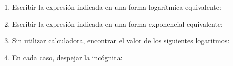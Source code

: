 \documentclass[11pt]{article}
\begin{document}
\begin{enumerate}
\item Escribir la expresi\'on indicada en una forma logar\'itmica equivalente:
  \begin{enumerate}
    
  \end{enumerate}

  
\item Escribir la expresi\'on indicada en una forma exponencial equivalente:



\item Sin utilizar calculadora, encontrar el valor de los siguientes logaritmos:
  \begin{enumerate}
  \end{enumerate}

  
\item En cada caso, despejar la inc\'ognita:
  \begin{enumerate}
  \end{enumerate}


\end{enumerate}
\end{document}
